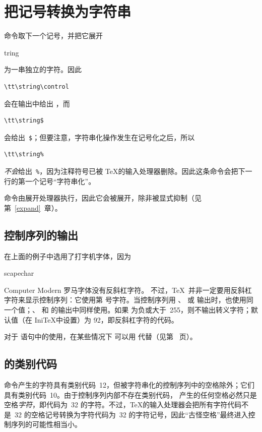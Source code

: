 \documentclass[a4paper]{rapport3}
\makeatletter
\def\IniTeX{Ini\TeX}\def\LamsTeX{LAMS\TeX}\def\VirTeX{Vir\TeX}
\def\cstoidx#1\par{\index{#1@\cs{#1}}}
\makeatother
\begin{document}
\section{把记号转换为字符串}

 命令取下一个记号，并把它展开
\cstoidx string\par
为一串独立的字符。因此
\begin{verbatim}
\tt\string\control
\end{verbatim}
会在输出中给出 ，而
\begin{verbatim}
\tt\string$
\end{verbatim}
会给出~\verb-$-；但要注意，字符串化操作发生在记号化之后，所以
\begin{verbatim}
\tt\string%
\end{verbatim}
{\em 不会\/}给出~\verb$%$，因为注释符号已被 \TeX 的输入处理器删除。因此这条命令会把下一行的第一个记号“字符串化”。

 命令由展开处理器执行，因此它会被展开，除非被显式抑制（见第~\ref{expand}~章）。

\subsection{控制序列的输出}

在上面的例子中选用了打字机字体，因为
\cstoidx escapechar\par
Computer Modern 罗马字体没有反斜杠字符。
\awp
不过，\TeX\ 并非一定要用反斜杠字符来显示控制序列：它使用第  号字符。当控制序列用 、 或  输出时，也使用同一个值；、 和  的输出中同样使用。如果  为负或大于~255，则不输出转义字符；默认值（在 \IniTeX 中设置）为 92，即反斜杠字符的代码。

对于  语句中的使用，在某些情况下  可以用  代替（见第~\pageref{expand:write} 页）。

\subsection{ 的类别代码}

 命令产生的字符具有类别代码~12，但被字符串化的控制序列中的空格除外；它们具有类别代码~10。由于控制序列内部不存在类别代码， 产生的任何空格必然只是空格{\em 字符\/}，即代码为~32 的字符。不过，\TeX 的输入处理器会把所有字符代码不是~32 的空格记号转换为字符代码为~32 的字符记号，因此“古怪空格”最终进入控制序列的可能性相当小。
\end{document}
